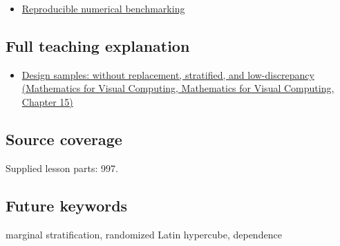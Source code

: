 \begin{itemize}
\tightlist
\item
  \hyperref[appendix-b9db93e28371]{Reproducible numerical benchmarking}
\end{itemize}

\subsection{Full teaching explanation}\label{appendix-1c5e85693a06-full-teaching-explanation}

\begin{itemize}
\tightlist
\item
  \href{../02-Mathematics-for-Visual-Computing/main.pdf\#nameddest=02-foundations-ii-ch031-design-samples-without-replacement-stratified-and-low-discrepancy}{Design samples: without replacement, stratified, and low-discrepancy (Mathematics for Visual Computing, Mathematics for Visual Computing, Chapter 15)}
\end{itemize}

\subsection{Source coverage}\label{appendix-1c5e85693a06-source-coverage}

Supplied lesson parts: 997.

\subsection{Future keywords}\label{appendix-1c5e85693a06-future-keywords}

marginal stratification, randomized Latin hypercube, dependence

